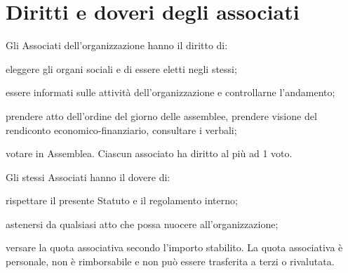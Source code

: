 \documentclass[legalpaper, 11pt]{exam}
\let\tempone\enumerate
\let\temptwo\endenumerate
\renewenvironment{enumerate}{\tempone\addtolength{\itemsep}{-0.45\baselineskip}}{\temptwo}
\begin{document}
\section{Diritti e doveri degli associati}
\begin{enumerate}
 \item Gli Associati dell'organizzazione hanno il diritto di:
 \vspace{-5pt}
 \begin{enumerate}
  \item eleggere gli organi sociali e di essere eletti negli stessi;
  \item essere informati sulle attività dell’organizzazione e controllarne l’andamento;
  \item prendere atto dell’ordine del giorno delle assemblee, prendere visione del rendiconto economico-finanziario, consultare i verbali;
  \item votare in Assemblea. Ciascun associato ha diritto al più ad 1 voto.
 \end{enumerate}
\item Gli stessi Associati hanno il dovere di:
\vspace{-5pt}
\begin{enumerate}
 \item rispettare il presente Statuto e il regolamento interno;
 \item astenersi da qualsiasi atto che possa nuocere all’organizzazione;
 \item versare la quota associativa secondo l’importo stabilito. La quota associativa è personale, non è rimborsabile e non può essere trasferita a terzi o rivalutata.
\end{enumerate}

\end{enumerate}
\end{document}
